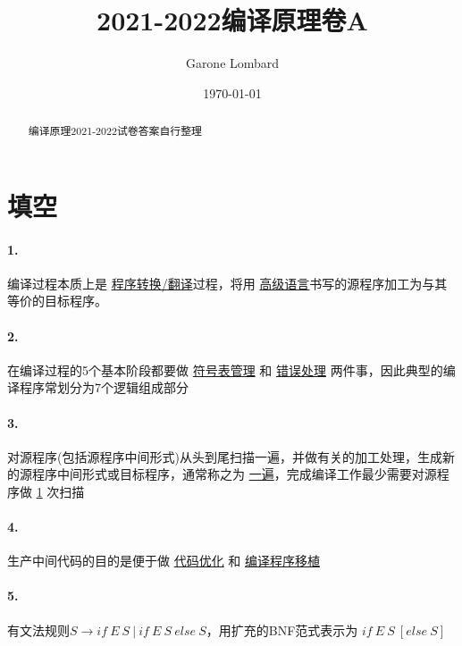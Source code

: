 \documentclass[UTF8]{ctexart} %
\title{2021-2022编译原理卷A}
\author{Garone Lombard}
\date{\today}
\begin{document}
\maketitle %

\newpage

\begin{abstract}
    编译原理2021-2022试卷答案自行整理
\end{abstract}

\newpage

\tableofcontents

\newpage

\section{填空}

\paragraph{1.} 编译过程本质上是 \underline{程序转换/翻译}过程，将用 \underline{高级语言}书写的源程序加工为与其等价的目标程序。

\paragraph{2.} 在编译过程的5个基本阶段都要做 \underline{符号表管理} 和 \underline{错误处理} 两件事，因此典型的编译程序常划分为7个逻辑组成部分

\paragraph{3.} 对源程序(包括源程序中间形式)从头到尾扫描一遍，并做有关的加工处理，生成新的源程序中间形式或目标程序，通常称之为 \underline{一遍}，完成编译工作最少需要对源程序做 \underline{1} 次扫描

\paragraph{4.} 生产中间代码的目的是便于做 \underline{代码优化} 和 \underline{编译程序移植}

\paragraph{5.} 有文法规则$S\rightarrow if\ E\ S\ |\ if\ E\ S\ else\ S$，用扩充的BNF范式表示为 \underline{$if\ E\ S\ [else\ S]$}
\end{document}
